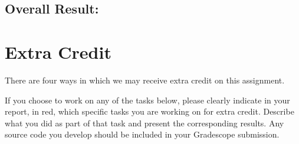 \documentclass[11pt]{article}
\begin{document}
\newpage

\subsection*{Overall Result:}

\begin{table}[H]
\centering
\caption{Overall best performance of each algorithm on each dataset. The gray cells indicate the highest value for each metric within the corresponding dataset.}
\label{tab:overall-results}
\end{table}

\newpage
\medskip



\newpage
\section{Extra Credit}
\label{sec:extra-credit}

There are four ways in which we may receive extra credit on this assignment.

If you choose to work on any of the tasks below, please clearly indicate in your report, in red, which specific tasks you are working on for extra credit. Describe what you did as part of that task and present the corresponding results. Any source code you develop should be included in your Gradescope submission.
\end{document}
